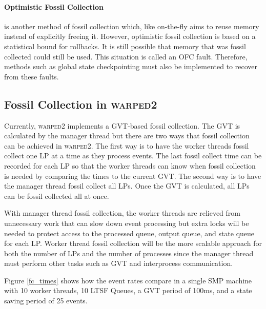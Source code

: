 \documentclass[11pt]{book}
\begin{document}
\paragraph{Optimistic Fossil Collection} \cite{young-98-dsc} is another method of fossil collection
which, like on-the-fly aims to reuse memory instead of explicitly freeing it.  However, optimistic
fossil collection is based on a statistical bound for rollbacks.  It is still possible that memory
that was fossil collected could still be used.  This situation is called an OFC fault.  Therefore,
methods such as global state checkpointing must also be implemented to recover from these faults.

\subsection{Fossil Collection in \textsc{warped2}}

Currently, \textsc{warped2} implements a GVT-based fossil collection.  The GVT is calculated by
the manager thread but there are two ways that fossil collection can be achieved in \textsc{warped2}.
The first way is to have the worker threads fossil collect one LP at a time as they process events.
The last fossil collect time can be recorded for each LP so that the worker threads can know when fossil
collection is needed by comparing the times to the current GVT.  The second way is to have the
manager thread fossil collect all LPs.  Once the GVT is calculated, all LPs can be fossil collected
all at once.

With manager thread fossil collection, the worker threads are relieved from unnecessary work
that can slow down event processing but extra locks will be needed to protect access to the
processed queue, output queue, and state queue for each LP.  Worker thread fossil collection
will be the more scalable approach for both the number of LPs and the number of processes since
the manager thread must perform other tasks such as GVT and interprocess communication.

Figure \ref{fc_times} shows how the event rates compare in a single SMP machine with 10 worker
threads, 10 LTSF Queues, a GVT period of 100ms, and a state saving period of 25 events.
\end{document}
